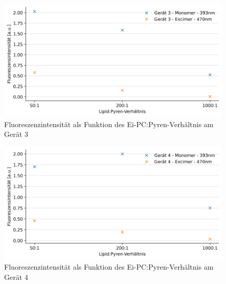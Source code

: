 \begin{figure}[h!]
	\begin{center}
		\begin{minipage}{0,8\textwidth}
			
			\includegraphics[width=\textwidth]{analysis/reports/Konz_Verh_Device3.png}
			\caption{Fluoreszenzintensität als Funktion des Ei-PC:Pyren-Verhältnis am Gerät 3} 
			\label{Konz_Verh_Device3} 
		\end{minipage}
	\end{center}
\end{figure}
\begin{figure}[h!]
	\begin{center}
		\begin{minipage}{0,8\textwidth}
			
			\includegraphics[width=\textwidth]{analysis/reports/Konz_Verh_Device4.png}
			\caption{Fluoreszenzintensität als Funktion des Ei-PC:Pyren-Verhältnis am Gerät 4} 
			\label{Konz_Verh_Device4} 
		\end{minipage}
	\end{center}
\end{figure}
\vspace*{3.4cm}

